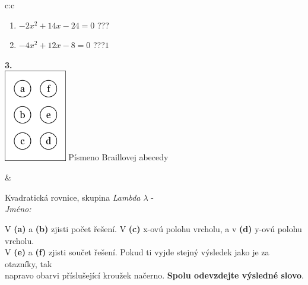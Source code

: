 \documentclass[10pt]{report}
\begin{document}
\begin{tabular}{c:c}
\begin{minipage}[c][104.5mm][t]{0.5\linewidth}
\begin{center}
\begin{minipage}{0.79\linewidth}
\begin{center}
\begin{varwidth}{\linewidth}
\begin{enumerate}
\item $-2x^2+14x-24=0$\quad \dotfill\; ???\;\dotfill {}
\item $-4x^2+12x-8=0$\quad \dotfill\; ???\;\dotfill \quad $1$
\end{enumerate}
\end{varwidth}
\end{center}
\end{minipage}
\begin{minipage}{0.20\linewidth}
\begin{center}
{\Huge\bfseries 3.} \\[2mm]
\includegraphics[height=40mm]{../images/braille.png}
{\small Písmeno Braillovej abecedy}
\end{center}
\end{minipage}
\end{center}
\end{minipage}
&
\begin{minipage}[c][104.5mm][t]{0.5\linewidth}
\begin{center}
\vspace{7mm}
{\huge Kvadratická rovnice, skupina \textit{Lambda $\lambda$} -}\\[5mm]
\textit{Jméno:}\phantom{xxxxxxxxxxxxxxxxxxxxxxxxxxxxxxxxxxxxxxxxxxxxxxxxxxxxxxxxxxxxxxxxx}\\[5mm]
\begin{minipage}{0.95\linewidth}
\begin{center}
V \textbf{(a)} a \textbf{(b)} zjisti počet řešení. V \textbf{(c)} x-ovú polohu vrcholu, a v \textbf{(d)} y-ovú polohu vrcholu.\\V \textbf{(e)} a \textbf{(f)} zjisti součet řešení. Pokud ti vyjde stejný výsledek jako je za otazníky, tak\\napravo obarvi příslušející kroužek načerno. \textbf{Spolu odevzdejte výsledné slovo}.
\end{center}
\end{minipage}
\\[1mm]
\begin{minipage}{0.79\linewidth}
\begin{center}

\end{center}
\end{minipage}
\end{center}
\end{minipage}
\end{tabular}
\end{document}
